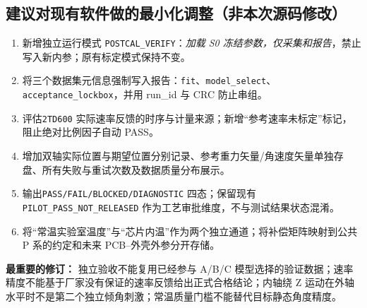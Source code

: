 \subsection{建议对现有软件做的最小化调整（非本次源码修改）}
\begin{enumerate}
\item 新增独立运行模式 \texttt{POSTCAL\_VERIFY}：\emph{加载 S0 冻结参数，仅采集和报告}，禁止写入新内参；原有标定模式保持不变。
\item 将三个数据集元信息强制写入报告：\texttt{fit}、\texttt{model\_select}、\texttt{acceptance\_lockbox}，并用 run\_id 与 CRC 防止串组。
\item 评估\texttt{2TD600} 实际速率反馈的时序与计量来源；新增“参考速率未标定”标记，阻止绝对比例因子自动 PASS。
\item 增加双轴实际位置与期望位置分别记录、参考重力矢量/角速度矢量单独存盘、所有失败与重试次数及数据质量分布展示。
\item 输出\texttt{PASS/FAIL/BLOCKED/DIAGNOSTIC} 四态；保留现有\texttt{PILOT\_PASS\_}\allowbreak\texttt{NOT\_RELEASED} 作为工艺审批维度，不与测试结果状态混淆。
\item 将“常温实验室温度”与“芯片内温”作为两个独立通道；将补偿矩阵映射到公共 P 系的约定和未来 PCB--外壳外参分开存储。
\end{enumerate}
\begin{keynote}
\textbf{最重要的修订：} 独立验收不能复用已经参与 A/B/C 模型选择的验证数据；速率精度不能基于厂家没有保证的速率反馈给出正式合格结论；内轴绕 Z 运动在外轴水平时不是第二个独立倾角刺激；常温质量门槛不能替代目标静态角度精度。
\end{keynote}
